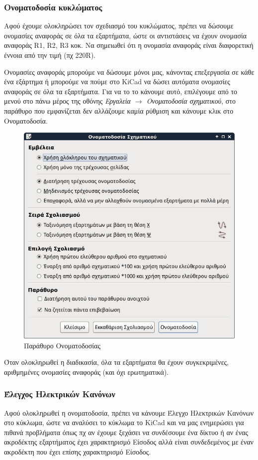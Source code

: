 \documentclass[a4paper]{article}
\begin{document}
\subsubsection{Ονοματοδοσία κυκλώματος}
Αφού έχουμε ολοκληρώσει τον σχεδιασμό του κυκλώματος, πρέπει να δώσουμε ονομασίες αναφοράς σε όλα τα εξαρτήματα, ώστε οι αντιστάσεις να έχουν ονομασία αναφοράς R1, R2, R3 κοκ. Να σημειωθεί ότι η ονομασία αναφοράς είναι διαφορετική έννοια από την τιμή (πχ 220R). 

Ονομασίες αναφοράς μπορούμε να δώσουμε μόνοι μας, κάνοντας επεξεργασία σε κάθε ένα εξάρτημα ή μπορούμε να πούμε στο \textenglish{KiCad} να δώσει αυτόματα ονομασίες αναφοράς σε όλα τα εξαρτήματα. Για να το το κάνουμε αυτό, επιλέγουμε από το μενού στο πάνω μέρος της οθόνης \textit{Εργαλεία $\rightarrow$ Ονοματοδοσία σχηματικού}, στο παράθυρο που εμφανίζεται δεν αλλάζουμε καμία ρύθμιση και κάνουμε κλικ στο Ονοματοδοσία.

\begin{figure}
  \begin{center}
    \includegraphics[width=.5\textwidth]{img/eesch-dial-annot.png}
    \caption{Παράθυρο Ονοματοδοσίας}
    \label{fig:eesch-dial-annot}
  \end{center}
\end{figure}

Όταν ολοκληρωθεί η διαδικασία, όλα τα εξαρτήματα θα έχουν συγκεκριμένες, αριθμημένες ονομασίες αναφοράς (και όχι ερωτηματικά).


\subsubsection{Έλεγχος Ηλεκτρικών Κανόνων}
Αφού ολοκληρωθεί η ονοματοδοσία, πρέπει να κάνουμε Έλεγχο Ηλεκτρικών Κανόνων στο κύκλωμα, ώστε να αναλύσει το κύκλωμα το \textenglish{KiCad} και να μας ενημερώσει για πιθανά προβλήματα όπως πχ αν έχουμε ξεχάσει να συνδέσουμε ένα δίκτυο ή αν ένας ακροδέκτης εξαρτήματος έχει χαρακτηρισμό Είσοδος αλλά είναι συνδεδεμένος με έναν ακροδέκτη που έχει επίσης χαρακτηρισμό Είσοδος.
\end{document}
